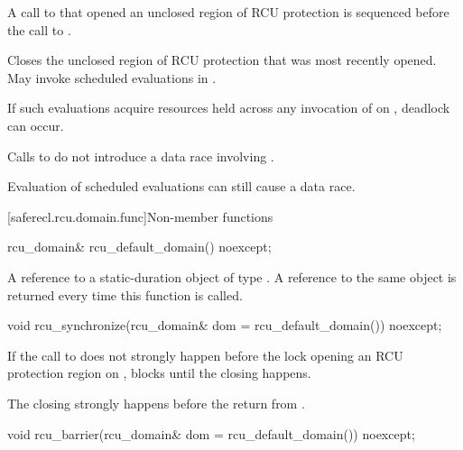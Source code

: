 \begin{itemdescr}
\pnum
\expects
A call to 
that opened an unclosed region of RCU protection
is sequenced before the call to .

\pnum
\effects
Closes the unclosed region of RCU protection
that was most recently opened.
May invoke scheduled evaluations in .

\pnum
\begin{note}
If such evaluations acquire resources
held across any invocation of  on ,
deadlock can occur.
\end{note}

\pnum
\remarks
Calls to  do not introduce a data race involving .
\begin{note}
Evaluation of scheduled evaluations can still cause a data race.
\end{note}
\end{itemdescr}

[saferecl.rcu.domain.func]{Non-member functions}

%
\begin{itemdecl}
rcu_domain& rcu_default_domain() noexcept;
\end{itemdecl}

\begin{itemdescr}
\pnum
\returns
A reference to a static-duration object of type .
A reference to the same object is returned every time this function is called.
\end{itemdescr}

%
\begin{itemdecl}
void rcu_synchronize(rcu_domain& dom = rcu_default_domain()) noexcept;
\end{itemdecl}

\begin{itemdescr}
\pnum
\effects
If the call to  does not strongly happen before
the lock opening an RCU protection region  on ,
blocks until the  closing  happens.

\pnum
\sync
The  closing 
strongly happens before the return from .
\end{itemdescr}

%
\begin{itemdecl}
void rcu_barrier(rcu_domain& dom = rcu_default_domain()) noexcept;
\end{itemdecl}

